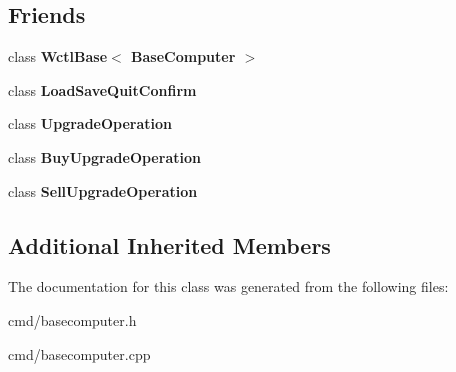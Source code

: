 \subsection*{Friends}
\begin{DoxyCompactItemize}
\item 
class {\bfseries Wctl\+Base$<$ Base\+Computer $>$}\hypertarget{classBaseComputer_a35a31bef0cac4e1f63f0eebf2eb04339}{}\label{classBaseComputer_a35a31bef0cac4e1f63f0eebf2eb04339}

\item 
class {\bfseries Load\+Save\+Quit\+Confirm}\hypertarget{classBaseComputer_aed32c38334cb910334c7d6a575ee28fc}{}\label{classBaseComputer_aed32c38334cb910334c7d6a575ee28fc}

\item 
class {\bfseries Upgrade\+Operation}\hypertarget{classBaseComputer_a3a75291c12bd401f9ccc200a44064e1a}{}\label{classBaseComputer_a3a75291c12bd401f9ccc200a44064e1a}

\item 
class {\bfseries Buy\+Upgrade\+Operation}\hypertarget{classBaseComputer_a80ccf2bfc6b8a2525fc5754a5133dd5b}{}\label{classBaseComputer_a80ccf2bfc6b8a2525fc5754a5133dd5b}

\item 
class {\bfseries Sell\+Upgrade\+Operation}\hypertarget{classBaseComputer_a1534467de6680b2f31d34cb1a0863ae7}{}\label{classBaseComputer_a1534467de6680b2f31d34cb1a0863ae7}

\end{DoxyCompactItemize}
\subsection*{Additional Inherited Members}


The documentation for this class was generated from the following files\+:\begin{DoxyCompactItemize}
\item 
cmd/basecomputer.\+h\item 
cmd/basecomputer.\+cpp\end{DoxyCompactItemize}
